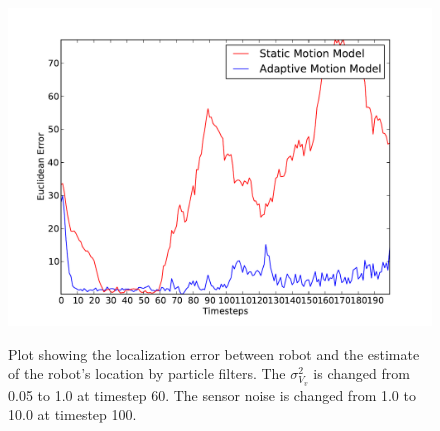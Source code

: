 \documentclass[12pt]{dalcsthesis}
\begin{document}
\begin{figure}[!ht]
  \centering
     {\includegraphics[height = 3.0 in]{./plots/200_005_05_s_10_100_100_traj_3_trial_1.pdf}}
  \caption{\label{fig-different sensor noise} Plot showing the localization error between robot and the estimate of the robot's location by particle filters. The $\sigma_{V_{v}}^{2}$ is changed from 0.05 to 1.0 at timestep 60. The sensor noise is changed from 1.0 to 10.0 at timestep 100. }
\end{figure}
\end{document}
